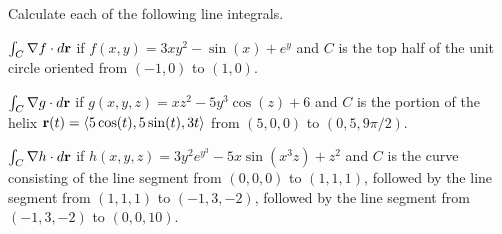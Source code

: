 \begin{activity} \label{A:12.4.1}  
Calculate each of the following line integrals.
\ba
\item $\int_C \nabla f\cdot d\mathbf{r}$ if $f(x,y) = 3xy^2 - \sin(x) + e^y$
  and $C$ is the top half of the unit circle oriented from $(-1,0)$ to $(1,0)$.
\item $\int_C \nabla g\cdot d\mathbf{r}$ if $g(x,y,z) = xz^2 - 5y^3\cos(z) + 6$
  and $C$ is the portion of the helix $\mathbf{r}(t) = \langle
  5\cos(t),5\sin(t),3t\rangle$ from $(5,0,0)$ to $(0,5,9\pi/2)$.
\item $\int_C \nabla h\cdot d\mathbf{r}$ if $h(x,y,z) = 3y^2e^{y^3} -
  5x\sin(x^3z) + z^2$
  and $C$ is the curve consisting of the line segment from $(0,0,0)$
  to $(1,1,1)$, followed by the line segment from $(1,1,1)$ to
  $(-1,3,-2)$, followed by the line segment from $(-1,3,-2)$ to $(0,0,10)$.

\ea
\end{activity}
\begin{smallhint}

\end{smallhint}
\begin{bighint}

\end{bighint}
\begin{activitySolution}

\end{activitySolution}
\aftera
